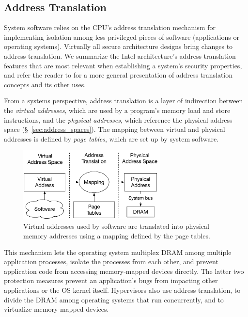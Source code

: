 \subsection{Address Translation}
\label{sec:paging}


System software relies on the CPU's address translation mechanism for
implementing isolation among less privileged pieces of software (applications
or operating systems). Virtually all secure architecture designs bring changes
to address translation. We summarize the Intel architecture's address
translation features that are most relevant when establishing a system's
security properties, and refer the reader to \cite{jacob1998virtual} for a more
general presentation of address translation concepts and its other uses.

From a systems perspective, address translation is a layer of indirection
between the \textit{virtual addresses}, which are used by a program's memory
load and store instructions, and the \textit{physical addresses}, which
reference the physical address space (\S~\ref{sec:address_spaces}). The mapping
between virtual and physical addresses is defined by \textit{page tables},
which are set up by system software.

\begin{figure}[hbt]
  \centering
  \includegraphics[width=75mm]{figures/address_translation.pdf}
  \caption{
    Virtual addresses used by software are translated into physical memory
    addresses using a mapping defined by the page tables.
  }
  \label{fig:address_translation}
\end{figure}

This mechanism lets the operating system multiplex DRAM among multiple
application processes, isolate the processes from each other, and prevent
application code from accessing memory-mapped devices directly. The latter two
protection measures prevent an application's bugs from impacting other
applications or the OS kernel itself. Hypervisors also use address translation,
to divide the DRAM among operating systems that run concurrently, and to
virtualize memory-mapped devices.

